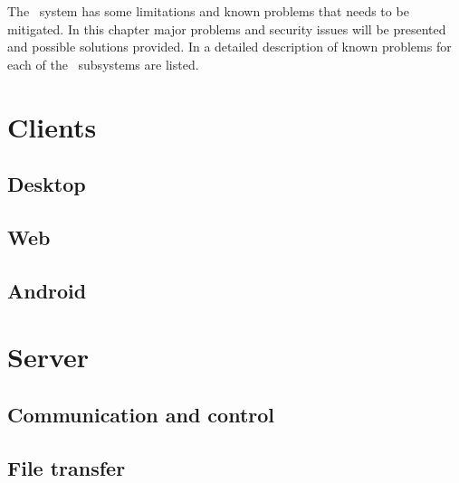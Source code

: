 The \appName\ system has some limitations and known problems that needs to be
mitigated. In this chapter major problems and security issues will be presented
and possible solutions provided. In  a detailed
description of known problems for each of the \appName\ subsystems are listed.

\section{Clients}
\subsection{Desktop}
\FloatBarrier
\subsection{Web}

\FloatBarrier
\subsection{Android}
\section{Server}
\subsection{Communication and control}

\subsection{File transfer}


